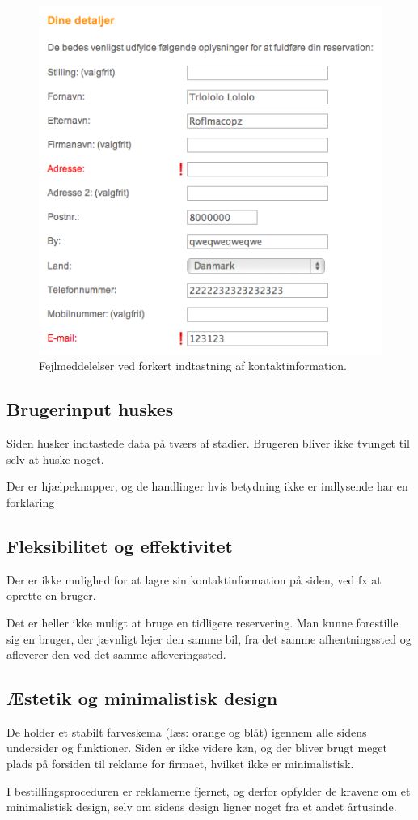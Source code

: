 \documentclass[a4paper]{article}
\begin{document}
\begin{figure}[]
  \begin{center}
    \includegraphics{8.png}
  \end{center}
  \caption{Fejlmeddelelser ved forkert indtastning af kontaktinformation.}
  \label{fejl_kontaktinformation}
\end{figure}

\subsection{Brugerinput huskes}
Siden husker indtastede data på tværs af stadier. Brugeren bliver ikke tvunget
til selv at huske noget.

Der er hjælpeknapper, og de handlinger hvis betydning ikke er indlysende har en
forklaring

\subsection{Fleksibilitet og effektivitet}
Der er ikke mulighed for at lagre sin kontaktinformation på siden, ved fx at
oprette en bruger.

Det er heller ikke muligt at bruge en tidligere reservering. Man kunne
forestille sig en bruger, der jævnligt lejer den samme bil, fra det samme
afhentningssted og afleverer den ved det samme afleveringssted.

\subsection{Æstetik og minimalistisk design}
De holder et stabilt farveskema (læs: orange og blåt) igennem alle sidens
undersider og funktioner. Siden er ikke videre køn, og der bliver brugt meget
plads på forsiden til reklame for firmaet, hvilket ikke er minimalistisk.

I bestillingsproceduren er reklamerne fjernet, og derfor opfylder de kravene om
et minimalistisk design, selv om sidens design ligner noget fra et andet
årtusinde.
\end{document}
